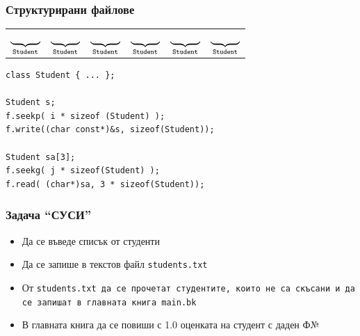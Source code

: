 \documentclass{beamer}
\begin{document}
\begin{frame}[fragile]
  \frametitle{Структурирани файлове}

  \begin{center}
    \newcommand{\yc}{\cellcolor{yellow}\hskip 1ex}
    \newcommand{\gc}{\cellcolor{green}\hskip 1ex}
    \newcommand{\bl}{\multicolumn{4}{c}{$\underbrace{\hskip 7ex}_{\tt{Student}}$}}
    \begin{tabular}{|c|c|c|c|c|c|c|c|c|c|c|c|c|c|c|c|c|c|c|c|c|c|c|c|}
      \hline
      \yc&\yc&\yc&\yc&\gc&\gc&\gc&\gc&\yc&\yc&\yc&\yc&\gc&\gc&\gc&\gc&\yc&\yc&\yc&\yc&\gc&\gc&\gc&\gc\\
      \hline
      \bl&\bl&\bl&\bl&\bl&\bl
    \end{tabular}
  \end{center}
  \vspace{1em}

\begin{verbatim}
class Student { ... };

Student s;
f.seekp( i * sizeof (Student) );
f.write((char const*)&s, sizeof(Student));

Student sa[3];
f.seekg( j * sizeof(Student) );
f.read( (char*)sa, 3 * sizeof(Student));
\end{verbatim}
\end{frame}

\begin{frame}
  \frametitle{Задача ``СУСИ''}

  \begin{itemize}
  \item Да се въведе списък от студенти
  \item Да се запише в текстов файл \tt{students.txt}
  \item От \tt{students.txt} да се прочетат студентите, които не са скъсани и да се запишат в главната книга \tt{main.bk}
  \item В главната книга да се повиши с 1.0 оценката на студент с даден Ф№
  \end{itemize}
\end{frame}
\end{document}
